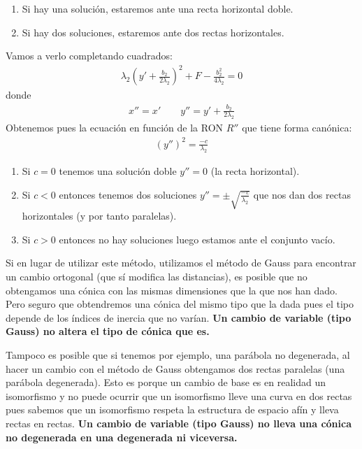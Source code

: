 \documentclass[14pt]{book}
\begin{document}
\begin{enumerate}
\begin{enumerate}
		\item Si hay una solución, estaremos ante una recta horizontal doble.
		\item Si hay dos soluciones, estaremos ante dos rectas horizontales.
	\end{enumerate}
	Vamos a verlo completando cuadrados:
	\begin{align*}
		\lambda_2(y' + \frac{b_2}{2\lambda_2})^2 + F - \frac{b_2^2}{4\lambda_2} = 0
	\end{align*}
	donde
	\begin{align*}
		x'' = x' \qquad y'' = y' + \frac{b_2}{2\lambda_2}
	\end{align*}
	Obtenemos pues la ecuación en función de la RON $R''$ que tiene forma canónica:
	\begin{align*}
		(y'')^2 = \frac{-c}{\lambda_2}
	\end{align*}
	\begin{enumerate}
		\item Si $c= 0$ tenemos una solución doble $y'' = 0$ (la recta horizontal).
		\item Si $c < 0$ entonces tenemos dos soluciones $y'' = \pm \sqrt{\frac{-c}{\lambda_2}}$ que nos dan dos rectas horizontales (y por tanto paralelas).
		\item Si $c > 0$ entonces no hay soluciones luego estamos ante el conjunto vacío.
	\end{enumerate}
\end{enumerate}

\begin{obs}
	Si en lugar de utilizar este método, utilizamos el método de Gauss para encontrar un cambio ortogonal (que sí modifica las distancias), es posible que no obtengamos una cónica con las mismas dimensiones que la que nos han dado. Pero seguro que obtendremos una cónica del mismo tipo que la dada pues el tipo depende de los índices de inercia que no varían. \textbf{Un cambio de variable (tipo Gauss) no altera el tipo de cónica que es.}
\end{obs}

\begin{obs}
	Tampoco es posible que si tenemos por ejemplo, una parábola no degenerada, al hacer un cambio con el método de Gauss obtengamos dos rectas paralelas (una parábola degenerada). Esto es porque un cambio de base es en realidad un isomorfismo y no puede ocurrir que un isomorfismo lleve una curva en dos rectas pues sabemos que un isomorfismo respeta la estructura de espacio afín y lleva rectas en rectas. \textbf{Un cambio de variable (tipo Gauss) no lleva una cónica no degenerada en una degenerada ni viceversa.}
\end{obs}
\end{document}
